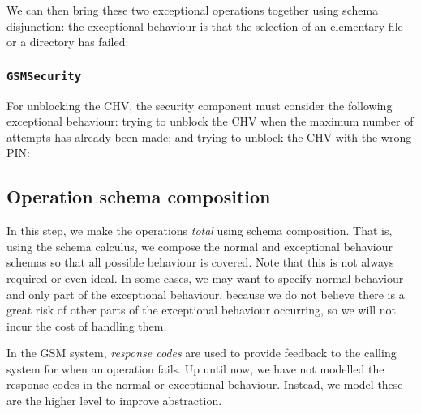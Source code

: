 We can then bring these two exceptional operations together using schema disjunction: the exceptional behaviour is that the selection of an elementary file or a directory has failed:



\subsubsection*{\texttt{GSMSecurity}}

For unblocking the CHV, the security component must consider the following exceptional behaviour: trying to unblock the CHV when the maximum number of attempts has already been made; and trying to unblock the CHV with the wrong PIN:





\subsection{Operation schema composition}

In this step, we make the operations \emph{total} using schema composition. That is, using the schema calculus, we compose the normal and exceptional behaviour schemas so that all possible behaviour is covered. Note that this is not always required or even ideal. In some cases, we may want to specify normal behaviour and only part of the exceptional behaviour, because we do not believe there is a great risk of other parts of the exceptional behaviour occurring, so we will not incur the cost of handling them.

In the GSM system, \emph{response codes} are used to provide feedback to the calling system for when an operation fails. Up until now, we have not modelled the response codes in the normal or exceptional behaviour. Instead, we model these are the higher level to improve abstraction.

